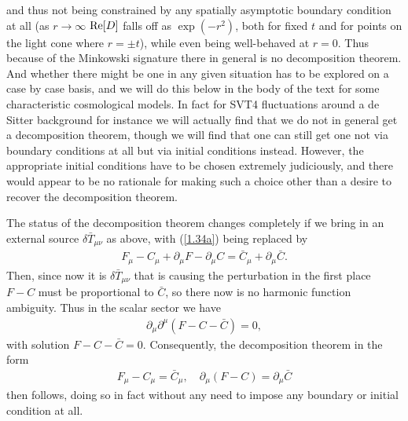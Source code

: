 %
and thus not being constrained by any spatially asymptotic boundary condition at all (as $r\rightarrow \infty$
${\rm Re}[D]$ falls off as $\exp(-r^2)$, both for fixed $t$ and for points on the light cone where $r=\pm t$), while even being well-behaved at $r=0$. Thus because of the Minkowski signature there in general is no decomposition theorem. And whether there might be one in any given situation has to be explored on a case by case basis, and we will do this below in the body of the text for some characteristic cosmological models. In fact for SVT4 fluctuations around a de Sitter background for instance we will actually find that we do not in general get a decomposition theorem, though we will find that one can still get one not via boundary conditions at all but via initial conditions instead. However, the appropriate initial conditions have to be chosen extremely judiciously, and there would appear to be no rationale for making such a choice other than a desire to recover the decomposition theorem.

The status of the decomposition theorem changes completely  if we bring in an external source $\delta \bar{T}_{\mu\nu}$ as above, with (\ref{1.34a}) being replaced by 
%
\begin{eqnarray}
F_{\mu}-C_{\mu}+\partial_{\mu}F-\partial_{\mu}C=\bar{C}_{\mu}+\partial_{\mu}\bar{C}.
\label{1.39a}
\end{eqnarray}
%
Then, since now it is $\delta \bar{T}_{\mu\nu}$ that is causing the perturbation in the first place $F-C$ must be proportional to $\bar{C}$, so there now is no harmonic function ambiguity. Thus in the scalar sector we have
%
\begin{eqnarray}
\partial_{\mu}\partial^{\mu}(F-C-\bar{C})=0, 
\label{1.40a}
\end{eqnarray}
%
with solution $F-C-\bar{C}=0$. Consequently,  the decomposition theorem in the form 
%
\begin{eqnarray}
F_{\mu}-C_{\mu}= \bar{C}_{\mu},\quad \partial_{\mu}(F-C)=\partial_{\mu}\bar{C}
\label{1.41a}
\end{eqnarray}
% 
then follows, doing so in fact without any need to impose any boundary or initial condition at all.

